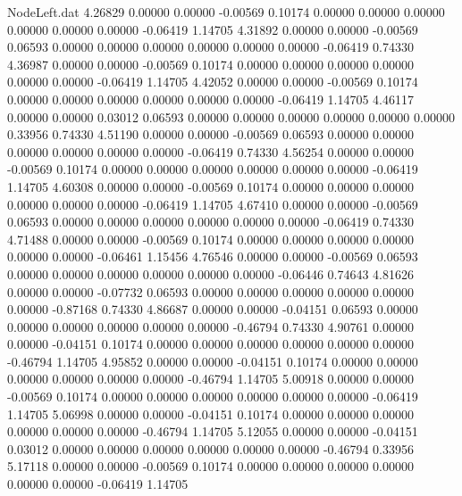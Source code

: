\begin{filecontents}{NodeLeft.dat}
   4.26829    0.00000    0.00000    -0.00569    0.10174    0.00000    0.00000    0.00000    0.00000    0.00000    0.00000   -0.06419    1.14705
   4.31892    0.00000    0.00000    -0.00569    0.06593    0.00000    0.00000    0.00000    0.00000    0.00000    0.00000   -0.06419    0.74330
   4.36987    0.00000    0.00000    -0.00569    0.10174    0.00000    0.00000    0.00000    0.00000    0.00000    0.00000   -0.06419    1.14705
   4.42052    0.00000    0.00000    -0.00569    0.10174    0.00000    0.00000    0.00000    0.00000    0.00000    0.00000   -0.06419    1.14705
   4.46117    0.00000    0.00000     0.03012    0.06593    0.00000    0.00000    0.00000    0.00000    0.00000    0.00000    0.33956    0.74330
   4.51190    0.00000    0.00000    -0.00569    0.06593    0.00000    0.00000    0.00000    0.00000    0.00000    0.00000   -0.06419    0.74330
   4.56254    0.00000    0.00000    -0.00569    0.10174    0.00000    0.00000    0.00000    0.00000    0.00000    0.00000   -0.06419    1.14705
   4.60308    0.00000    0.00000    -0.00569    0.10174    0.00000    0.00000    0.00000    0.00000    0.00000    0.00000   -0.06419    1.14705
   4.67410    0.00000    0.00000    -0.00569    0.06593    0.00000    0.00000    0.00000    0.00000    0.00000    0.00000   -0.06419    0.74330
   4.71488    0.00000    0.00000    -0.00569    0.10174    0.00000    0.00000    0.00000    0.00000    0.00000    0.00000   -0.06461    1.15456
   4.76546    0.00000    0.00000    -0.00569    0.06593    0.00000    0.00000    0.00000    0.00000    0.00000    0.00000   -0.06446    0.74643
   4.81626    0.00000    0.00000    -0.07732    0.06593    0.00000    0.00000    0.00000    0.00000    0.00000    0.00000   -0.87168    0.74330
   4.86687    0.00000    0.00000    -0.04151    0.06593    0.00000    0.00000    0.00000    0.00000    0.00000    0.00000   -0.46794    0.74330
   4.90761    0.00000    0.00000    -0.04151    0.10174    0.00000    0.00000    0.00000    0.00000    0.00000    0.00000   -0.46794    1.14705
   4.95852    0.00000    0.00000    -0.04151    0.10174    0.00000    0.00000    0.00000    0.00000    0.00000    0.00000   -0.46794    1.14705
   5.00918    0.00000    0.00000    -0.00569    0.10174    0.00000    0.00000    0.00000    0.00000    0.00000    0.00000   -0.06419    1.14705
   5.06998    0.00000    0.00000    -0.04151    0.10174    0.00000    0.00000    0.00000    0.00000    0.00000    0.00000   -0.46794    1.14705
   5.12055    0.00000    0.00000    -0.04151    0.03012    0.00000    0.00000    0.00000    0.00000    0.00000    0.00000   -0.46794    0.33956
   5.17118    0.00000    0.00000    -0.00569    0.10174    0.00000    0.00000    0.00000    0.00000    0.00000    0.00000   -0.06419    1.14705

\end{filecontents}
